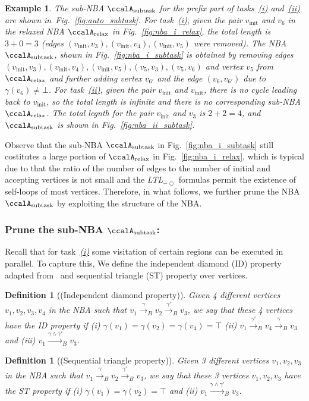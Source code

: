 \documentclass[Afour,sageh,times]{sagej}
\newtheorem{exmp}{Example}
\newtheorem{defn}[thm]{Definition}
\newcommand{\ltl}{ {\it LTL}$_{-\bigcirc}$ }
\newcommand{\auto}[1]{\ccalA_{\text{#1}}}
\newenvironment{cexmp}
{\addtocounter{exmp}{-1}\begin{exmp}}
  {\end{exmp}}
\begin{document}
     \begin{cexmp}
       The sub-NBA $\auto{subtask}$ for the prefix part of tasks~\hyperref[task:i]{\it (i)} and~\hyperref[task:i]{\it (ii)} are shown in~Fig.~\ref{fig:auto_subtask}. For task~\hyperref[task:i]{\it (i)}, given the pair $v_{\text{init}}$ and $v_6$ in the relaxed NBA $\auto{relax}$ in Fig.~\ref{fig:nba_i_relax}, the total length is $3+0=3$ (edges $(v_{\text{init}}, v_3), (v_{\text{init}}, v_4), (v_{\text{init}}, v_5)$ were removed). The NBA $\auto{subtask}$, shown in  Fig.~\ref{fig:nba_i_subtask} is obtained by removing edges $(v_{\text{init}}, v_3), (v_{\text{init}}, v_4), (v_{\text{init}}, v_5), (v_5, v_3),  (v_5, v_6)$ and vertex $v_5$ from $\auto{relax}$ and further adding vertex $v_{6'}$ and the edge $(v_6, v_{6'})$ due to $\gamma(v_6)\neq \bot$. For task~\hyperref[task:i]{\it (ii)}, given the pair $v_{\text{init}}$ and $v_{\text{init}}$,  there is no cycle leading back to $v_{\text{init}}$, so the total length is infinite and there is no corresponding sub-NBA $\auto{relax}$. The total legnth for the pair $v_{\text{init}}$ and $v_3$ is $2+2=4$, and $\auto{subtask}$ is shown in  Fig.~\ref{fig:nba_ii_subtask}.
     \end{cexmp}

Observe that the sub-NBA $\auto{subtask}$ in Fig.~\ref{fig:nba_i_subtask} still costitutes a large portion of  $\auto{relax}$ in Fig.~\ref{fig:nba_i_relax}, which is typical due to that the ratio of the number of edges to the number of initial and accepting vertices is not small and the \ltl formulas permit the existence of self-loops of most vertices. Therefore, in what follows, we further prune the NBA $\auto{subtask}$  by exploiting the structure of the NBA.

  \subsubsection{Prune the sub-NBA \upshape $\auto{subtask}$:} \label{sub-NBA:2}
Recall that for task~\hyperref[task:i]{\it (i)}  some visitation of certain regions can be executed in parallel. To capture this, We define the independent diamond (ID) property adapted from~\cite{stefanescu2006automatic}  and sequential triangle (ST) property over vertices.
\begin{defn}[(Independent diamond property)]\label{defn:id}
Given 4 different vertices $v_1, v_2, v_3, v_4$ in the NBA such that $v_1 \xrightarrow{\gamma}_B v_2 \xrightarrow{\gamma'}_B v_3$, we say that these 4 vertices have the ID property if {\it (i)} $\gamma(v_1) = \gamma(v_2) = \gamma(v_4) = \top$  {\it (ii)} $v_1 \xrightarrow{\gamma'}_B v_4 \xrightarrow{\gamma}_B v_3$ and (iii) $v_1 \xrightarrow{\gamma \wedge \gamma'}_B v_3$.
\end{defn}
\begin{defn}[(Sequential triangle property)]
  Given 3 different vertices $v_1, v_2, v_3$ in the NBA such that $v_1 \xrightarrow{\gamma}_B v_2 \xrightarrow{\gamma'}_B v_3$, we say that these 3 vertices $v_1, v_2, v_3$ have the ST property if {\it (i)} $\gamma(v_1) = \gamma(v_2) = \top$  and {\it (ii)} $v_1 \xrightarrow{\gamma \wedge \gamma'}_B v_3$.
\end{defn}
\end{document}
